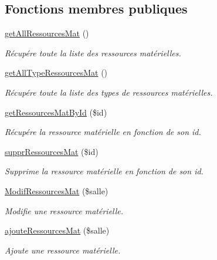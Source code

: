 \subsection*{Fonctions membres publiques}
\begin{DoxyCompactItemize}
\item 
\hyperlink{class_m___ressources_mat_aca0f140427dd888eb839c18e4e2ec2d9}{get\+All\+Ressources\+Mat} ()
\begin{DoxyCompactList}\small\item\em Récupére toute la liste des ressources matérielles. \end{DoxyCompactList}\item 
\hyperlink{class_m___ressources_mat_a14a2d603e9b876d51386f8ab26a86c99}{get\+All\+Type\+Ressources\+Mat} ()
\begin{DoxyCompactList}\small\item\em Récupére toute la liste des types de ressources matérielles. \end{DoxyCompactList}\item 
\hyperlink{class_m___ressources_mat_a5907518ad69b7325e50a7b972569ff97}{get\+Ressources\+Mat\+By\+Id} (\$id)
\begin{DoxyCompactList}\small\item\em Récupére la ressource matérielle en fonction de son id. \end{DoxyCompactList}\item 
\hyperlink{class_m___ressources_mat_aab349f1d1de76b59b8ff78a8a7af1001}{suppr\+Ressources\+Mat} (\$id)
\begin{DoxyCompactList}\small\item\em Supprime la ressource matérielle en fonction de son id. \end{DoxyCompactList}\item 
\hyperlink{class_m___ressources_mat_af8fff51a4e63987b2624c6e5f749dd76}{Modif\+Ressources\+Mat} (\$salle)
\begin{DoxyCompactList}\small\item\em Modifie une ressource matérielle. \end{DoxyCompactList}\item 
\hyperlink{class_m___ressources_mat_af1001fa4d1abca848af86e58fbd2e297}{ajoute\+Ressources\+Mat} (\$salle)
\begin{DoxyCompactList}\small\item\em Ajoute une ressource matérielle. \end{DoxyCompactList}\end{DoxyCompactItemize}



